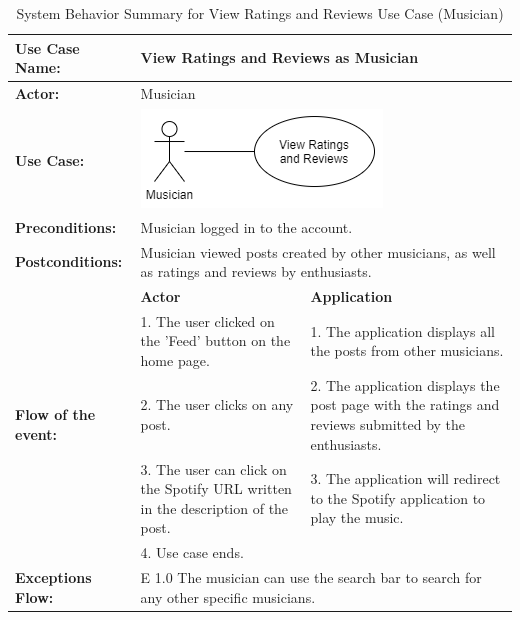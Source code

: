 \begin{longtable}{|p{3cm}|p{5cm}|p{5cm}|}
    \caption{\centering System Behavior Summary for View Ratings and Reviews Use Case (Musician)} \\
    \hline
    \textbf{Use Case Name:} & \multicolumn{2}{l|}{View Ratings and Reviews as Musician} \\ \hline
    \textbf{Actor:} & \multicolumn{2}{l|}{Musician} \\ \hline
    \textbf{Use Case:} & \multicolumn{2}{l|}{\includegraphics[width=0.5\linewidth]{mainmatter/images/sucd4.png}} \\ \hline
    \textbf{Preconditions:} & \multicolumn{2}{p{10cm}|}{Musician logged in to the account.} \\ \hline
    \textbf{Postconditions:} & \multicolumn{2}{p{10cm}|}{Musician viewed posts created by other musicians, as well as ratings and reviews by enthusiasts.} \\ \hline
    \multirow{5}{3cm}{\raggedright \textbf{Flow of the event:}} & \textbf{Actor} & \textbf{Application} \\ \cline{2-3}
    & 1. The user clicked on the 'Feed' button on the home page. & 1. The application displays all the posts from other musicians. \\ \cline{2-3}
    & 2. The user clicks on any post. & 2. The application displays the post page with the ratings and reviews submitted by the enthusiasts.  \\ \cline{2-3}
    & 3. The user can click on the Spotify URL written in the description of the post. & 3. The application will redirect to the Spotify application to play the music. \\ \cline{2-3}
    & 4. Use case ends. & \\ \hline
    \multirow{1}{3cm}{\raggedright \textbf{Exceptions Flow:}} & \multicolumn{2}{p{10cm}|}{\raggedright E 1.0 The musician can use the search bar to search for any other specific musicians.} \\ \hline
\end{longtable}
\pagebreak

